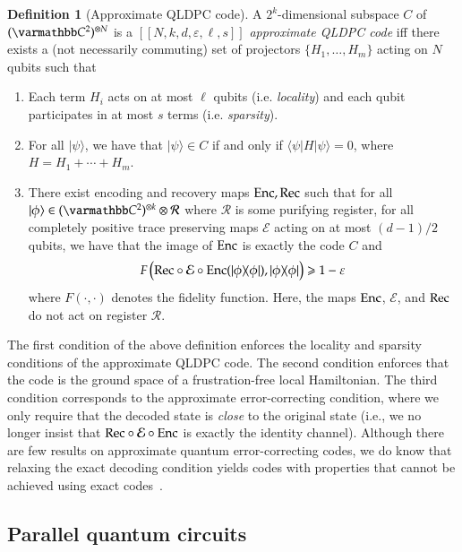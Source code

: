 \documentclass[11pt,letterpaper]{article}
\theoremstyle{definition}
\newtheorem{definition}[theorem]{Definition}
\theoremstyle{remark}
\let\mathbb\varmathbb
\newcommand{\Paren}[1]{\left(#1\right)}
\newcommand{\C}{\mathbb C}
\newcommand{\cE}{\mathcal E}
\renewcommand{\geq}{\geqslant}
\let\epsilon=\varepsilon
\numberwithin{equation}{section}
\newcommand{\eps}{\epsilon}
\theoremstyle{definition}
\newcommand{\ket}[1]{|#1\rangle}
\newcommand{\bra}[1]{\langle#1|}
\newcommand{\ketbra}[2]{|#1\rangle\! \langle #2|}
\begin{document}
\begin{definition}[Approximate QLDPC code]
  A $2^k$-dimensional subspace $C$ of $(\C^2)^{\otimes N}$ is a $[[N,k,d,\eps,\ell,s]]$ \emph{approximate QLDPC code} iff there exists a (not necessarily commuting) set of projectors $\{H_1,\ldots,H_m\}$ acting on $N$ qubits such that
  \begin{enumerate}
    \item Each term $H_i$ acts on at most $\ell$ qubits (i.e. \emph{locality}) and each qubit participates in at most $s$ terms (i.e. \emph{sparsity}).
    \item For all $\ket{\psi}$, we have that $\ket{\psi} \in C$ if and only if $\bra{\psi} H \ket{\psi} = 0$, where $H = H_1 + \cdots + H_m$. 
    \item There exist encoding and recovery maps $\mathrm{Enc},\mathrm{Rec}$ such that for all $\ket{\phi} \in (\C^2)^{\otimes k} \otimes \mathcal{R}$ where $\mathcal{R}$ is some purifying register, for all completely positive trace preserving maps $\mathcal{E}$ acting on at most $(d-1)/2$ qubits, we have that the image of $\mathrm{Enc}$ is exactly the code $C$ and 
  \begin{equation}
    F \Paren{ \Rec \circ \cE \circ \Enc(\ketbra{\phi}{\phi}), \ketbra{\phi}{\phi} } \geq 1 - \eps
  \end{equation}
  where $F(\cdot,\cdot)$ denotes the fidelity function. Here, the maps $\mathrm{Enc}$, $\mathcal{E}$, and $\mathrm{Rec}$ do not act on register $\mathcal{R}$.
  \end{enumerate}
  \end{definition}
The first condition of the above definition enforces the locality and sparsity conditions of the approximate QLDPC code. The second condition enforces that the code is the ground space of a frustration-free local Hamiltonian. The third condition corresponds to the approximate error-correcting condition, where we only require that the decoded state is \emph{close} to the original state (i.e., we no longer insist that $\Rec \circ \cE \circ \Enc$ is exactly the identity channel). Although there are few results on approximate quantum error-correcting codes, we do know that relaxing the exact decoding condition yields codes with properties that cannot be achieved using exact codes~\cite{leung1997approximate,beny2010general}.

\subsection{Parallel quantum circuits}
\label{subsec:parallel}
\end{document}
